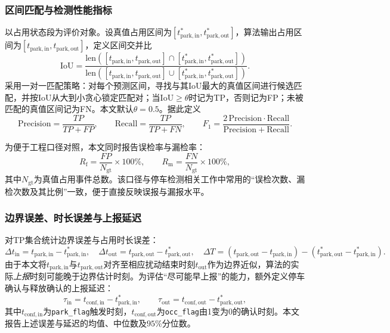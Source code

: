 \documentclass{xdupgthesis}
\begin{document}
\subsubsection{区间匹配与检测性能指标}

以占用状态段为评价对象。设真值占用区间为$[t^{*}_{\mathrm{park,in}},t^{*}_{\mathrm{park,out}}]$，算法输出占用区间为$[t_{\mathrm{park,in}},t_{\mathrm{park,out}}]$，定义区间交并比
\begin{equation}
\mathrm{IoU}=
\frac{\mathrm{len}\!\left([t_{\mathrm{park,in}}, t_{\mathrm{park,out}}]\cap[t^{*}_{\mathrm{park,in}}, t^{*}_{\mathrm{park,out}}]\right)}
{\mathrm{len}\!\left([t_{\mathrm{park,in}}, t_{\mathrm{park,out}}]\cup[t^{*}_{\mathrm{park,in}}, t^{*}_{\mathrm{park,out}}]\right)}.
\end{equation}
采用一对一匹配策略：对每个预测区间，寻找与其$\mathrm{IoU}$最大的真值区间进行候选匹配，并按$\mathrm{IoU}$从大到小贪心锁定匹配对；当$\mathrm{IoU}\ge\theta$时记为TP，否则记为FP；未被匹配的真值区间记为FN。本文默认$\theta=0.5$。据此定义
\begin{equation}
\mathrm{Precision}=\frac{TP}{TP+FP},\qquad
\mathrm{Recall}=\frac{TP}{TP+FN},\qquad
F_1=\frac{2\,\mathrm{Precision}\cdot\mathrm{Recall}}{\mathrm{Precision}+\mathrm{Recall}}.
\end{equation}

为便于工程口径对照，本文同时报告误检率与漏检率：
\begin{equation}
R_{\mathrm{f}}=\frac{FP}{N_{\mathrm{gt}}}\times 100\%,\qquad
R_{\mathrm{m}}=\frac{FN}{N_{\mathrm{gt}}}\times 100\%,
\end{equation}
其中$N_{\mathrm{gt}}$为真值占用事件总数。该口径与停车检测相关工作中常用的“误检次数、漏检次数及其比例”一致，便于直接反映误报与漏报水平。

\subsubsection{边界误差、时长误差与上报延迟}

对TP集合统计边界误差与占用时长误差：
\begin{equation}
\Delta t_{\mathrm{in}} = t_{\mathrm{park,in}} - t^{*}_{\mathrm{park,in}},\quad
\Delta t_{\mathrm{out}} = t_{\mathrm{park,out}} - t^{*}_{\mathrm{park,out}},\quad
\Delta T = (t_{\mathrm{park,out}} - t_{\mathrm{park,in}}) - (t^{*}_{\mathrm{park,out}} - t^{*}_{\mathrm{park,in}}).
\end{equation}
由于本文将$t_{\mathrm{park,in}}$与$t_{\mathrm{park,out}}$对齐至相应扰动结束时刻$t_{\mathrm{out}}$作为边界近似，算法的实际\emph{上报}时刻可能晚于边界估计时刻。为评估“尽可能早上报”的能力，额外定义停车确认与释放确认的上报延迟：
\begin{equation}
\tau_{\mathrm{in}} = t_{\mathrm{conf,in}} - t^{*}_{\mathrm{park,in}},\qquad
\tau_{\mathrm{out}} = t_{\mathrm{conf,out}} - t^{*}_{\mathrm{park,out}},
\end{equation}
其中$t_{\mathrm{conf,in}}$为\texttt{park\_flag}触发时刻，$t_{\mathrm{conf,out}}$为\texttt{occ\_flag}由1变为0的确认时刻。本文报告上述误差与延迟的均值、中位数及$95\%$分位数。
\end{document}
